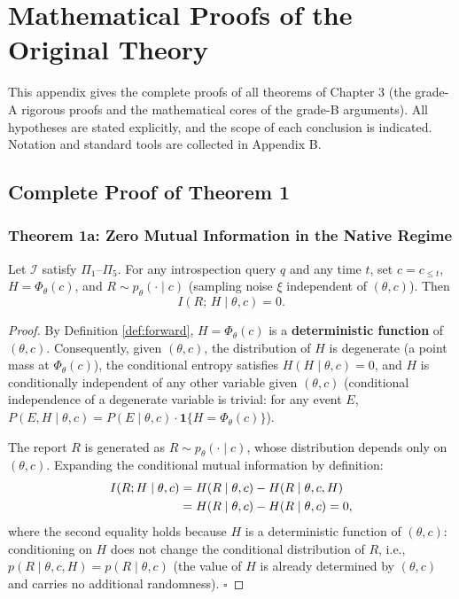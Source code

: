 \appendix
\section{Mathematical Proofs of the Original Theory}

This appendix gives the complete proofs of all theorems of Chapter 3 (the grade-A rigorous
proofs and the mathematical cores of the grade-B arguments). All hypotheses are stated
explicitly, and the scope of each conclusion is indicated. Notation and standard tools are
collected in Appendix B.

\subsection{Complete Proof of Theorem 1}

\subsubsection{Theorem 1a: Zero Mutual Information in the Native Regime}

\begin{restate}[Theorem 1a]
Let $\mathcal{I}$ satisfy $\Pi_1$--$\Pi_5$. For any introspection query $q$ and any time $t$,
set $c = c_{\le t}$, $H = \Phi_\theta(c)$, and $R \sim p_\theta(\cdot \mid c)$ (sampling
noise $\xi$ independent of $(\theta, c)$). Then
\begin{equation}
I\!\left(R;\,H \mid \theta, c\right) = 0 .
\label{eq:a-thm1a}
\end{equation}
\end{restate}

\begin{proof}
By Definition \ref{def:forward}, $H = \Phi_\theta(c)$ is a \textbf{deterministic function} of
$(\theta, c)$. Consequently, given $(\theta, c)$, the distribution of $H$ is degenerate (a point
mass
at $\Phi_\theta(c)$), the conditional entropy satisfies $H(H \mid \theta, c) = 0$, and $H$ is
conditionally independent of any other variable given $(\theta, c)$ (conditional independence
of a degenerate variable is trivial: for any event $E$,
$P(E, H \mid \theta, c) = P(E \mid \theta, c) \cdot \mathbf{1}\{H = \Phi_\theta(c)\}$).

The report $R$ is generated as $R \sim p_\theta(\cdot \mid c)$, whose distribution depends
only on $(\theta, c)$. Expanding the conditional mutual information by definition:
\begin{align}
I\!\left(R; H \mid \theta, c\right)
&= H\!\left(R \mid \theta, c\right) - H\!\left(R \mid \theta, c, H\right) \notag\\
&= H\!\left(R \mid \theta, c\right) - H\!\left(R \mid \theta, c\right)
= 0 ,
\label{eq:a-thm1a-proof}
\end{align}
where the second equality holds because $H$ is a deterministic function of $(\theta,c)$:
conditioning on $H$ does not change the conditional distribution of $R$, i.e.,
$p(R \mid \theta, c, H) = p(R \mid \theta, c)$ (the value of $H$ is already determined by
$(\theta, c)$ and carries no additional randomness). $\square$
\end{proof}

